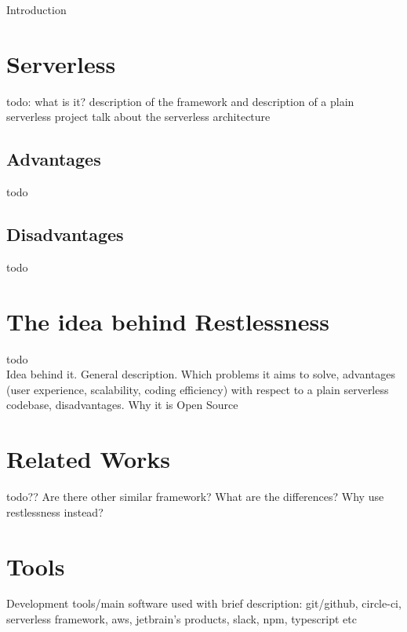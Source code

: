 \begin{chapter}{Introduction}
    \label{chap:intro}

    \section{Serverless}
    todo: what is it? description of the framework and description of a plain serverless
    project
    talk about the serverless architecture

    \subsection{Advantages}
    todo

    \subsection{Disadvantages}
    todo

    \section{The idea behind Restlessness}
    todo\\
    Idea behind it. General description. Which problems it aims to solve, advantages (user experience,
    scalability, coding efficiency) with respect to a plain serverless codebase,
    disadvantages. Why it is Open Source

    \section{Related Works}
    todo??
    Are there other similar framework? What are the differences? Why use restlessness instead?

    \section{Tools}
    Development tools/main software used with brief description: git/github, circle-ci, serverless framework,
    aws, jetbrain's products, slack, npm, typescript etc

\end{chapter}